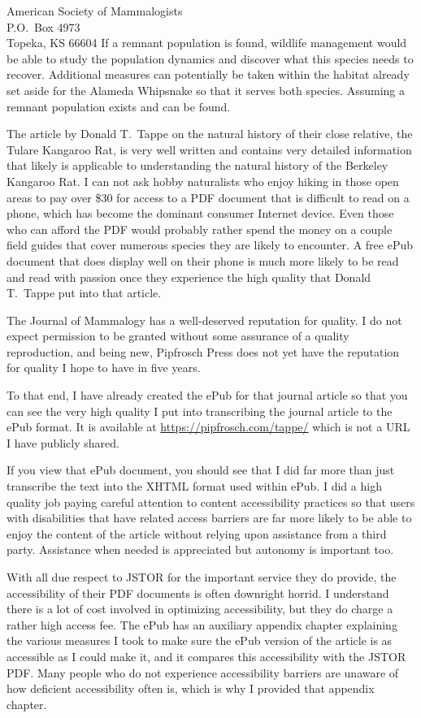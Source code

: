 \documentclass[letterpaper,11pt]{letter}
\begin{document}
\begin{letter}{American Society of Mammalogists\\P.O.\ Box 4973\\Topeka, KS 66604}
If a remnant population is found, wildlife management would be able to study the population dynamics and discover what this species needs to recover. Additional measures can potentially be taken within the habitat already set aside for the Alameda Whipsnake so that it serves both species. Assuming a remnant population exists and can be found.

The article by Donald T.\ Tappe on the natural history of their close relative, the Tulare Kangaroo Rat, is very well written and contains very detailed information that likely is applicable to understanding the natural history of the Berkeley Kangaroo Rat. I can not ask hobby naturalists who enjoy hiking in those open areas to pay over \$30 for access to a PDF document that is difficult to read on a phone, which has become the dominant consumer Internet device. Even those who can afford the PDF would probably rather spend the money on a couple field guides that cover numerous species they are likely to encounter. A free ePub document that does display well on their phone is much more likely to be read and read with passion once they experience the high quality that Donald T.\ Tappe put into that article.

The Journal of Mammalogy has a well-deserved reputation for quality. I do not expect permission to be granted without some assurance of a quality reproduction, and being new, Pipfrosch Press does not yet have the reputation for quality I hope to have in five years.

To that end, I have already created the ePub for that journal article so that you can see the very high quality I put into transcribing the journal article to the ePub format. It is available at \url{https://pipfrosch.com/tappe/} which is not a URL I have publicly shared.

If you view that ePub document, you should see that I did far more than just transcribe the text into the XHTML format used within ePub. I did a high quality job paying careful attention to content accessibility practices so that users with disabilities that have related access barriers are far more likely to be able to enjoy the content of the article without relying upon assistance from a third party. Assistance when needed is appreciated but autonomy is important too.

With all due respect to JSTOR for the important service they do provide, the accessibility of their PDF documents is often downright horrid. I understand there is a lot of cost involved in optimizing accessibility, but they do charge a rather high access fee. The ePub has an auxiliary appendix chapter explaining the various measures I took to make sure the ePub version of the article is as accessible as I could make it, and it compares this accessibility with the JSTOR PDF. Many people who do not experience accessibility barriers are unaware of how deficient accessibility often is, which is why I provided that appendix chapter.


\end{letter}
\end{document}
